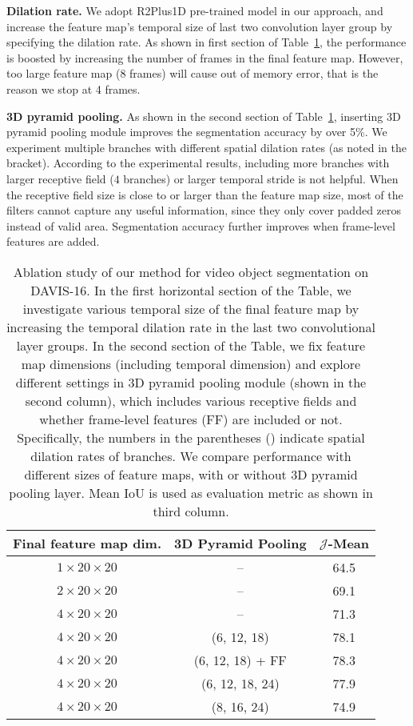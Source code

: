 \documentclass{bmvc2k}
\begin{document}
\textbf{Dilation rate.} We adopt R2Plus1D pre-trained model in our approach, and increase the feature map's temporal size of last two convolution layer group by specifying the dilation rate. 
As shown in first section of Table~\ref{tab:ablation}, the performance is boosted by increasing the number of frames in the final feature map. However, too large feature map (8 frames) will cause out of memory error, that is the reason we stop at 4 frames.



\textbf{3D pyramid pooling.} As shown in the second section of Table~\ref{tab:ablation}, inserting 3D pyramid pooling module improves the segmentation accuracy by over 5\%. We experiment multiple branches with different spatial dilation rates (as noted in the bracket). According to the experimental results, including more branches with larger receptive field ($4$ branches) or larger temporal stride is not helpful. When the receptive field size is close to or larger than the feature map size, most of the filters cannot capture any useful information, since they only cover padded zeros instead of valid area. Segmentation accuracy further improves when frame-level features are added.



\begin{table}[!htbp]
\centering
\begin{tabular}{c|c|c}
\hline
Final feature map dim.  & 3D Pyramid Pooling    & $\mathcal{J}$-Mean \\
\hline
$1\times20\times20$     & --                    & 64.5 \\
$2\times20\times20$     & --                    & 69.1 \\
$4\times20\times20$     & --                    & 71.3 \\
\hline
$4\times20\times20$     & (6, 12, 18)           & 78.1 \\
$4\times20\times20$     & (6, 12, 18) + FF      & 78.3 \\
$4\times20\times20$     & (6, 12, 18, 24)       & 77.9 \\
$4\times20\times20$     & (8, 16, 24)           & 74.9 \\
\hline
\end{tabular}
\caption{Ablation study of our method for video object segmentation on DAVIS-16. 
In the first horizontal section of the Table, we investigate various temporal size of the final feature map by increasing the temporal dilation rate in the last two convolutional layer groups. In the second section of the Table, we fix feature map dimensions (including temporal dimension) and explore different settings in 3D pyramid pooling module (shown in the second column), which includes various receptive fields and whether frame-level features (FF) are included or not. Specifically, the numbers in the parentheses () indicate spatial dilation rates of branches. We compare  performance with different sizes of feature maps,  
with or without 3D pyramid pooling layer. 
Mean IoU is used as evaluation metric as shown in third column. 
}
\label{tab:ablation}
\end{table}
\end{document}
